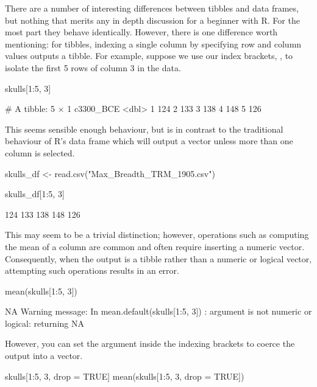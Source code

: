 \noindent
There are a number of interesting differences between tibbles and data frames, but nothing that merits any in depth discussion for a beginner with R. For the most part they behave identically. However, there is one difference worth mentioning: for tibbles, indexing a single column by specifying row and column values outputs a tibble. For example, suppose we use our index brackets, \R{[ ]}, to isolate the first 5 rows of column 3 in the  data.

\begin{inR}
skulls[1:5, 3]
\end{inR}

\begin{outR}
# A tibble: 5 × 1
  c3300_BCE
      <dbl>
1       124
2       133
3       138
4       148
5       126
\end{outR}

\noindent This seems sensible enough behaviour, but is in contrast to the traditional behaviour of R's data frame which will output a vector unless more than one column is selected.

\begin{inR}
skulls_df <- read.csv("Max_Breadth_TRM_1905.csv")

skulls_df[1:5, 3]
\end{inR}

\begin{outR}
[1] 124 133 138 148 126
\end{outR}

This may seem to be a trivial distinction; however, operations such as computing the mean of a column are common and often require inserting a numeric vector. Consequently, when the output is a tibble rather than a numeric or logical vector, attempting such operations results in an error.

\begin{inR}
mean(skulls[1:5, 3])
\end{inR}

\begin{outR}
[1] NA
Warning message:
In mean.default(skulls[1:5, 3]) :
  argument is not numeric or logical: returning NA
\end{outR}

\noindent However, you can set the argument  inside the indexing brackets to coerce the output into a vector.

\begin{inR}
skulls[1:5, 3, drop = TRUE]
mean(skulls[1:5, 3, drop = TRUE])
\end{inR}

